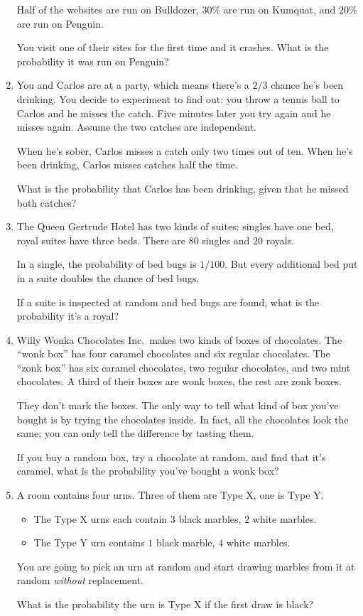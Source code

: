 \documentclass[justified]{tufte-book}
\providecommand{\tightlist}{%
  \setlength{\itemsep}{0pt}\setlength{\parskip}{0pt}}
\theoremstyle{definition}
\theoremstyle{definition}
\theoremstyle{definition}
\theoremstyle{remark}
\begin{document}
\begin{enumerate}
  Half of the websites are run on Bulldozer, \(30\%\) are run on
  Kumquat, and \(20\%\) are run on Penguin.

  You visit one of their sites for the first time and it crashes. What
  is the probability it was run on Penguin?
\item
  You and Carlos are at a party, which means there's a \(2/3\) chance
  he's been drinking. You decide to experiment to find out: you throw a
  tennis ball to Carlos and he misses the catch. Five minutes later you
  try again and he misses again. Assume the two catches are independent.

  When he's sober, Carlos misses a catch only two times out of ten. When
  he's been drinking, Carlos misses catches half the time.

  What is the probability that Carlos has been drinking, given that he
  missed both catches?
\item
  The Queen Gertrude Hotel has two kinds of suites: singles have one
  bed, royal suites have three beds. There are \(80\) singles and \(20\)
  royals.

  In a single, the probability of bed bugs is \(1/100\). But every
  additional bed put in a suite doubles the chance of bed bugs.

  If a suite is inspected at random and bed bugs are found, what is the
  probability it's a royal?
\item
  Willy Wonka Chocolates Inc.~makes two kinds of boxes of chocolates.
  The ``wonk box'' has four caramel chocolates and six regular
  chocolates. The ``zonk box'' has six caramel chocolates, two regular
  chocolates, and two mint chocolates. A third of their boxes are wonk
  boxes, the rest are zonk boxes.

  They don't mark the boxes. The only way to tell what kind of box
  you've bought is by trying the chocolates inside. In fact, all the
  chocolates look the same; you can only tell the difference by tasting
  them.

  If you buy a random box, try a chocolate at random, and find that it's
  caramel, what is the probability you've bought a wonk box?
\item
  A room contains four urns. Three of them are Type X, one is Type Y.

  \begin{itemize}
  \tightlist
  \item
    The Type X urns each contain \(3\) black marbles, \(2\) white
    marbles.
  \item
    The Type Y urn contains \(1\) black marble, \(4\) white marbles.
  \end{itemize}

  You are going to pick an urn at random and start drawing marbles from
  it at random \emph{without} replacement.

  What is the probability the urn is Type X if the first draw is black?
\end{enumerate}
\end{document}
